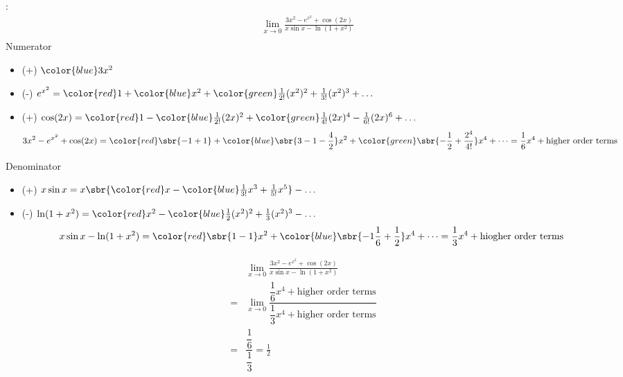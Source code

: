 : \begin{align*}
& \lim_{x \to 0} \frac{3x^2 - e^{x^2} + \cos (2x)}{x\sin x - \ln (1+x^2)}\\
\end{align*}
Numerator
\begin{itemize}
    \item (+) \({\color{blue} 3x^2}\)
    \item (-) \(e^{x^2} = {\color{red} 1 } + {\color{blue} x^2 } + {\color{green} \frac{1}{2!} (x^2)^2 } + \frac{1}{3!} (x^2)^3 + \dots\)
    \item (+) \(\cos (2x) = {\color{red} 1 } - {\color{blue} \frac{1}{2!}(2x)^2 } + {\color{green} \frac{1}{4!} (2x)^4 }   - \frac{1}{6!} (2x)^6 + \dots\)
\begin{align*}
3x^2 - e^{x^2} + \cos(2x) = {\color{red} \sbr{-1 + 1} } + {\color{blue} \sbr{3 - 1 - \frac{4}{2}}x^2 } + {\color{green} \sbr{-\frac{1}{2} + \frac{2^4}{4!}}x^4 } + \dots = \frac{1}{6} x^4 + \text{higher order terms}
\end{align*}
\end{itemize}
Denominator
\begin{itemize}
    \item (+) \(x \sin x = x \sbr{{\color{red} x } - {\color{blue} \frac{1}{3!} x^3 } + \frac{1}{5!} x^5} - \dots\)
    \item (-) \(\ln (1+ x^2) = {\color{red} x^2 } - {\color{blue} \frac{1}{2}(x^2)^2 } + \frac{1}{3}(x^2)^3 - \dots\)
    \begin{align*}
    x\sin x - \ln (1+x^2) = {\color{red} \sbr{1 - 1}x^2 } + {\color{blue} \sbr{-1\frac{1}{6} + \frac{1}{2}} x^4 } + \dots = \frac{1}{3} x^4 + \text{hiogher order terms}
    \end{align*}
\end{itemize}
\begin{align*}
& \lim_{x \to 0} \frac{3x^2 - e^{x^2} + \cos (2x)}{x\sin x - \ln (1+x^2)}\\
=& \lim_{x \to 0} \dfrac{\dfrac{1}{6}x^4 + \text{higher order terms}}{\dfrac{1}{3}x^4 + \text{higher order terms}} \\
=& \dfrac{\dfrac{1}{6}}{\dfrac{1}{3}} = \frac{1}{2}
\end{align*}


\newpage
